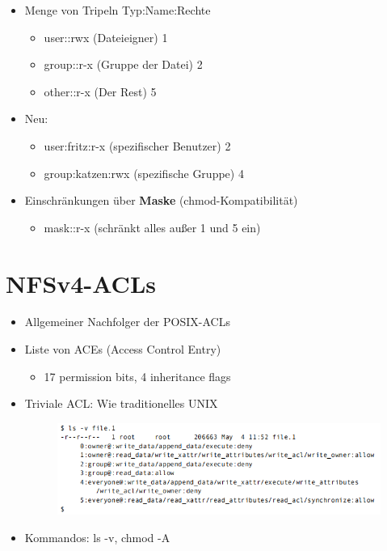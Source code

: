 \documentclass[openany]{book}
\begin{document}
\begin{itemize}
\item Menge von Tripeln Typ:Name:Rechte
\begin{itemize}
\item user::rwx  (Dateieigner)           1
\item group::r-x (Gruppe der Datei)  2
\item other::r-x  (Der Rest)               5
\end{itemize}
\item Neu:
\begin{itemize}
\item user:fritz:r-x         (spezifischer Benutzer) 2
\item group:katzen:rwx (spezifische Gruppe)     4
\end{itemize}
\item Einschränkungen über \textbf{Maske} (chmod-Kompatibilität)
\begin{itemize}
\item mask::r-x (schränkt alles außer 1 und 5 ein)
\end{itemize}
\end{itemize}

\section{NFSv4-ACLs}

\begin{itemize}
\item Allgemeiner Nachfolger der POSIX-ACLs
\item Liste von ACEs (Access Control Entry)
\begin{itemize}
\item 17 permission bits, 4 inheritance flags
\end{itemize}
\item Triviale ACL: Wie traditionelles UNIX
\begin{figure}[h!]
\centering
\includegraphics[width=\linewidth]{Pics/NFSACLs.PNG}
\end{figure}
\item Kommandos: ls -v, chmod -A
\end{itemize}
\end{document}
